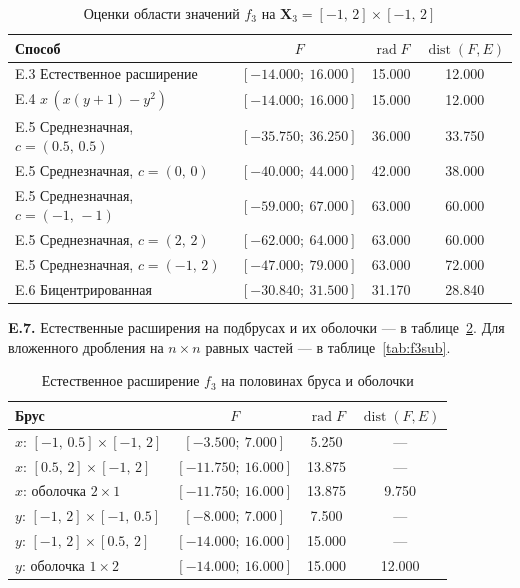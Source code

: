 \documentclass[a4paper, 14pt]{extarticle}
\begin{document}
\begin{table}[H]
    \centering
    \small
    \caption{Оценки области значений $f_3$ на $\mathbf{X}_3 = [-1,\,2]\times[-1,\,2]$}
    \label{tab:f3}
    \begin{tabular}{|l|c|c|c|}
        \hline
        Способ & $F$ & $\operatorname{rad}F$ & $\operatorname{dist}(F, E)$ \\ \hline
        E.3 Естественное расширение & $[-14.000;\ 16.000]$ & 15.000 & 12.000 \\ \hline
        E.4 $x\,(x(y+1)-y^2)$ & $[-14.000;\ 16.000]$ & 15.000 & 12.000 \\ \hline
        E.5 Среднезначная, $c=(0.5,\,0.5)$ & $[-35.750;\ 36.250]$ & 36.000 & 33.750 \\ \hline
        E.5 Среднезначная, $c=(0,\,0)$ & $[-40.000;\ 44.000]$ & 42.000 & 38.000 \\ \hline
        E.5 Среднезначная, $c=(-1,\,-1)$ & $[-59.000;\ 67.000]$ & 63.000 & 60.000 \\ \hline
        E.5 Среднезначная, $c=(2,\,2)$ & $[-62.000;\ 64.000]$ & 63.000 & 60.000 \\ \hline
        E.5 Среднезначная, $c=(-1,\,2)$ & $[-47.000;\ 79.000]$ & 63.000 & 72.000 \\ \hline
        E.6 Бицентрированная & $[-30.840;\ 31.500]$ & 31.170 & 28.840 \\ \hline
    \end{tabular}
\end{table}


\textbf{E.7.} Естественные расширения на подбрусах и их оболочки --- в таблице~\ref{tab:f3half}. Для вложенного дробления на $n\times n$ равных частей --- в таблице~\ref{tab:f3sub}.

\begin{table}[H]
    \centering
    \small
    \caption{Естественное расширение $f_3$ на половинах бруса и оболочки}
    \label{tab:f3half}
    \begin{tabular}{|l|c|c|c|}
        \hline
        Брус & $F$ & $\operatorname{rad}F$ & $\operatorname{dist}(F, E)$ \\ \hline
        $x$: $[-1,\,0.5]\times[-1,\,2]$ & $[-3.500;\ 7.000]$ & 5.250 & --- \\ \hline
        $x$: $[0.5,\,2]\times[-1,\,2]$ & $[-11.750;\ 16.000]$ & 13.875 & --- \\ \hline
        $x$: оболочка $2\times1$ & $[-11.750;\ 16.000]$ & 13.875 & 9.750 \\ \hline
        $y$: $[-1,\,2]\times[-1,\,0.5]$ & $[-8.000;\ 7.000]$ & 7.500 & --- \\ \hline
        $y$: $[-1,\,2]\times[0.5,\,2]$ & $[-14.000;\ 16.000]$ & 15.000 & --- \\ \hline
        $y$: оболочка $1\times2$ & $[-14.000;\ 16.000]$ & 15.000 & 12.000 \\ \hline
    \end{tabular}
\end{table}
\end{document}
